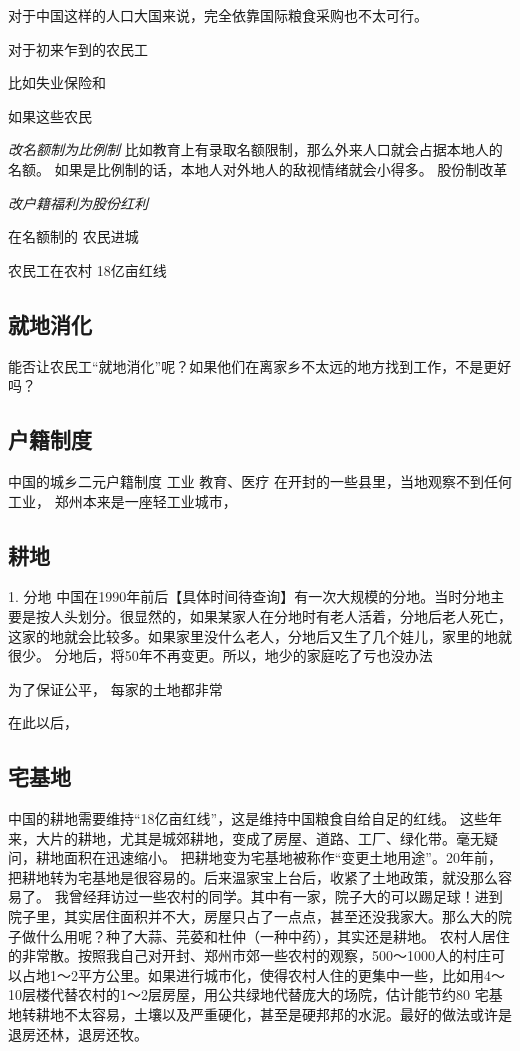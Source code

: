 对于中国这样的人口大国来说，完全依靠国际粮食采购也不太可行。

对于初来乍到的农民工

比如失业保险和

如果这些农民

\emph{改名额制为比例制}
比如教育上有录取名额限制，那么外来人口就会占据本地人的名额。
如果是比例制的话，本地人对外地人的敌视情绪就会小得多。
股份制改革

\emph{改户籍福利为股份红利}

在名额制的
农民进城

农民工在农村
18亿亩红线



\subsection{就地消化}
能否让农民工“就地消化”呢？如果他们在离家乡不太远的地方找到工作，不是更好吗？

\subsection{户籍制度}
中国的城乡二元户籍制度
工业
教育、医疗
在开封的一些县里，当地观察不到任何工业，
郑州本来是一座轻工业城市，
\subsection{耕地}
1. 分地
中国在1990年前后【具体时间待查询】有一次大规模的分地。当时分地主要是按人头划分。很显然的，如果某家人在分地时有老人活着，分地后老人死亡，这家的地就会比较多。如果家里没什么老人，分地后又生了几个娃儿，家里的地就很少。
分地后，将50年不再变更。所以，地少的家庭吃了亏也没办法

为了保证公平，
每家的土地都非常

在此以后，
\subsection{宅基地}
中国的耕地需要维持“18亿亩红线”，这是维持中国粮食自给自足的红线。
这些年来，大片的耕地，尤其是城郊耕地，变成了房屋、道路、工厂、绿化带。毫无疑问，耕地面积在迅速缩小。
把耕地变为宅基地被称作“变更土地用途”。20年前，把耕地转为宅基地是很容易的。后来温家宝上台后，收紧了土地政策，就没那么容易了。
我曾经拜访过一些农村的同学。其中有一家，院子大的可以踢足球！进到院子里，其实居住面积并不大，房屋只占了一点点，甚至还没我家大。那么大的院子做什么用呢？种了大蒜、芫荽和杜仲（一种中药），其实还是耕地。
农村人居住的非常散。按照我自己对开封、郑州市郊一些农村的观察，500～1000人的村庄可以占地1～2平方公里。如果进行城市化，使得农村人住的更集中一些，比如用4～10层楼代替农村的1～2层房屋，用公共绿地代替庞大的场院，估计能节约80%
宅基地转耕地不太容易，土壤以及严重硬化，甚至是硬邦邦的水泥。最好的做法或许是退房还林，退房还牧。

